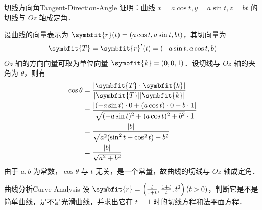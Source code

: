 \begin{problem}{切线方向角}{Tangent-Direction-Angle}
    证明：曲线 $x = a \cos t, y = a \sin t, z = b t$ 的切线与 $Oz$ 轴成定角．
\end{problem}

\begin{myproof}
    设曲线的向量表示为 $\symbfit{r}(t) = (a \cos t, a \sin t, bt)$，其切向量为
    \begin{equation}
        \symbfit{T} = \symbfit{r}'(t) = (-a \sin t, a \cos t, b)
    \end{equation}
    $Oz$ 轴的方向向量可取为单位向量 $\symbfit{k} = (0, 0, 1)$．设切线与 $Oz$ 轴的夹角为 $\theta$，则有
    \begin{equation}
        \begin{aligned}
            \cos \theta & = \frac{|\symbfit{T} \cdot \symbfit{k}|}{|\symbfit{T}| |\symbfit{k}|}                                              \\
                        & = \frac{|(-a \sin t) \cdot 0 + (a \cos t) \cdot 0 + b \cdot 1|}{\sqrt{(-a \sin t)^2 + (a \cos t)^2 + b^2} \cdot 1} \\
                        & = \frac{|b|}{\sqrt{a^2(\sin^2 t + \cos^2 t) + b^2}}                                                                \\
                        & = \frac{|b|}{\sqrt{a^2 + b^2}}
        \end{aligned}
    \end{equation}
    由于 $a, b$ 为常数，$\cos \theta$ 与 $t$ 无关，是一个常量，故曲线的切线与 $Oz$ 轴成定角．
\end{myproof}


\begin{problem}{曲线分析}{Curve-Analysis}
    设 $\symbfit{r} = \left(\frac{t}{1+t}, \frac{1+t}{t}, t^2\right) (t > 0)$，判断它是不是简单曲线，是不是光滑曲线，并求出它在 $t = 1$ 时的切线方程和法平面方程．
\end{problem}

